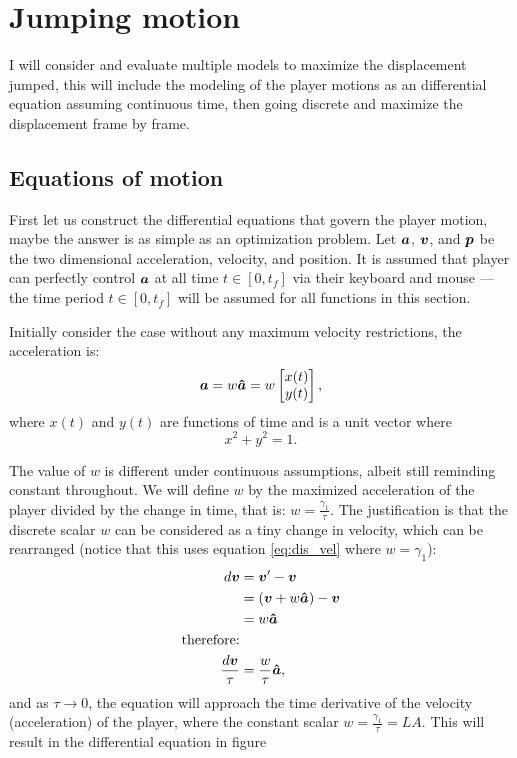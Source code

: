 \section{Jumping motion}
I will consider and evaluate multiple models to maximize the displacement jumped, this will include the modeling of the player motions as an differential equation assuming continuous time, then going discrete and maximize the displacement frame by frame.

\subsection{Equations of motion}
First let us construct the differential equations that govern the player motion, maybe the answer is as simple as an optimization problem. Let $\boldsymbol{a}$, $\boldsymbol{v}$, and $\boldsymbol{p}$ be the two dimensional acceleration, velocity, and position. It is assumed that player can perfectly control $\boldsymbol{a}$ at all time $t \in [0, t_f]$ via their keyboard and mouse --- the time period $t\in[0,t_f]$ will be assumed for all functions in this section.

Initially consider the case without any maximum velocity restrictions, the acceleration is:
\begin{align*}
    \boldsymbol{a} = w\boldsymbol{\hat{a}} = w\begin{bmatrix}x(t)\\y(t) \end{bmatrix},
\end{align*}
where $x(t)$ and $y(t)$ are functions of time and is a unit vector where
\[
x^2 + y^2 = 1.
\]

The value of $w$ is different under continuous assumptions, albeit still reminding constant throughout. We will define $w$ by the maximized acceleration of the player divided by the change in time, that is: $w = \frac{\gamma_1}{\tau}$. The justification is that the discrete scalar $w$ can be considered as a tiny change in velocity, which can be rearranged (notice that this uses equation \ref{eq:dis_vel} where $w=\gamma_1$):
\begin{align*}
    d\boldsymbol{v} &=  \boldsymbol{v}' - \boldsymbol{v}\\
    &= (\boldsymbol{v} + w \boldsymbol{\hat{a}}) - \boldsymbol{v}\\
    &= w \boldsymbol{\hat{a}}\\
    \text{therefore:}&\\
    \frac{d\boldsymbol{v}}{\tau} &= \frac{w}{\tau} \boldsymbol{\hat{a}},
\end{align*}
and as $\tau \to 0$, the equation will approach the time derivative of the velocity (acceleration) of the player, where the constant scalar $w=\frac{\gamma_1}{\tau} = LA$. This will result in the  differential equation in figure

